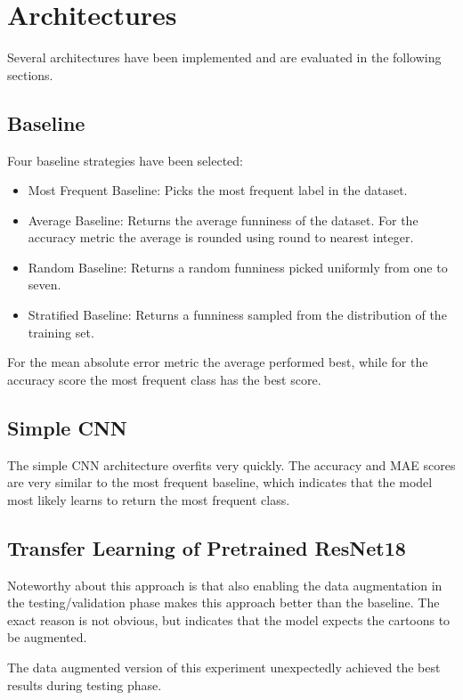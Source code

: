 \documentclass[draft,final,oneside]{vutinfth} %
\begin{document}
\section{Architectures}
Several architectures have been implemented and are evaluated in the following sections.


\subsection{Baseline}

Four baseline strategies have been selected: 

\begin{itemize}

\item Most Frequent Baseline: Picks the most frequent label in the dataset.
\item Average Baseline: Returns the average funniness of the dataset. For the accuracy metric the average is rounded using round to nearest integer.
\item Random Baseline: Returns a random funniness picked uniformly from one to seven.
\item Stratified Baseline: Returns a funniness sampled from the distribution of the
training set.

\end{itemize}

For the mean absolute error metric the average performed best, while for the accuracy score the most frequent class has the best score.

\subsection{Simple CNN}
The simple CNN architecture overfits very quickly. The accuracy and MAE scores are very similar to the most frequent baseline, which indicates that the model most likely learns to return the most frequent class.

\subsection{Transfer Learning of Pretrained ResNet18}
Noteworthy about this approach is that also enabling the data augmentation in the testing/validation phase makes this approach better than the baseline. The exact reason is not obvious, but indicates that the model expects the cartoons to be augmented.

The data augmented version of this experiment unexpectedly achieved the best results during testing phase.
\end{document}
